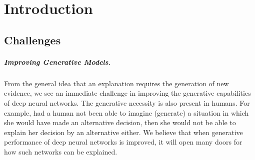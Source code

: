 \chapter{Introduction}
\label{chap:intro}


\section{Challenges}\label{sec:challenges}

\paragraph{Improving Generative Models.}
From the general idea that an explanation requires the generation of new evidence, we see an immediate challenge in improving the generative capabilities of deep neural networks.
The generative necessity is also present in humans.
For example, had a human not been able to imagine (generate) a situation in which she would have made an alternative decision, then she would not be able to explain her decision by an alternative either.
We believe that when generative performance of deep neural networks is improved, it will open many doors for how such networks can be explained.


